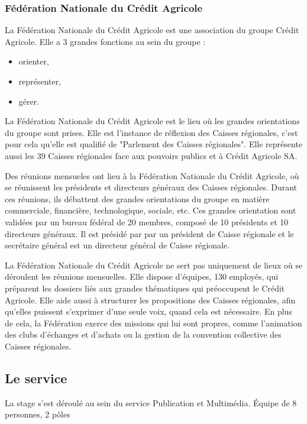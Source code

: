 \documentclass[12pt,a4paper]{article}
\begin{document}
\subsubsection{Fédération Nationale du Crédit Agricole}
La Fédération Nationale du Crédit Agricole est une association du groupe Crédit Agricole. Elle a 3 grandes fonctions au sein du groupe : 
\begin{itemize}
\item orienter,
\item représenter,
\item gérer.
\end{itemize}
La Fédération Nationale du Crédit Agricole est le lieu où les grandes orientations du groupe sont prises. Elle est l'instance de réflexion des Caisses régionales, c'est pour cela qu'elle est qualifié de "Parlement des Caisses régionales". Elle représente aussi les 39 Caisses régionales face aux pouvoirs publics et à Crédit Agricole SA.\par 
\bigskip
Des réunions mensueles ont lieu à la Fédération Nationale du Crédit Agricole, où se réunissent les présidents et directeurs généraux des Caisses régionales. Durant ces réunions, ils débattent des grandes orientations du groupe en matière commerciale, financière, technologique, sociale, etc. Ces grandes orientation sont validées par un bureau fédéral de 20 membres, composé de 10 présidents et 10 directeurs généraux. Il est présidé par par un président de Caisse régionale et le secrétaire général est un directeur général de Caisse régionale.\par 
\bigskip
La Fédération Nationale du Crédit Agricole ne sert pas uniquement de lieux où se déroulent les réunions mensuelles. Elle dispose d'équipes, 130 employés, qui préparent les dossiers liés aux grandes thématiques qui préoccupent le Crédit Agricole. Elle aide aussi à structurer les propositions des Caisses régionales, afin qu'elles puissent s'exprimer d'une seule voix, quand cela est nécessaire. En plus de cela, la Fédération exerce des missions qui lui sont propres, comme l'animation des clubs d'échanges et d'achats ou la gestion de la convention collective des Caisses régionales.\par

\subsection{Le service}
La stage s'est déroulé au sein du service Publication et Multimédia. Équipe de 8 personnes, 2 pôles\par
\end{document}
